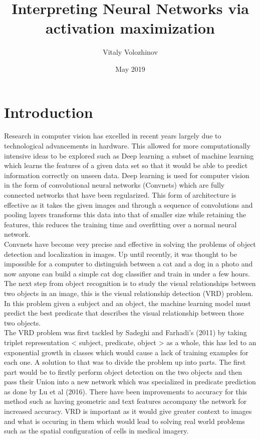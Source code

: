 \documentclass{csfyp}
\title{Interpreting Neural Networks via activation maximization}
\author{Vitaly Volozhinov}
\date{May 2019}
\newcommand\tab[1][1cm]{\hspace*{#1}}
\begin{document}
\tableofcontents


\setcounter{page}{1}
\newpage

\section{Introduction}
\label{s:intro}
\tab
Research in computer vision has excelled in recent years largely due to technological advancements in hardware. This allowed for more computationally intensive ideas to be explored such as Deep learning a subset of machine learning which learns the features of a given data set so that it would be able to predict information correctly on unseen data.
Deep learning is used for computer vision in the form of convolutional neural networks (Convnets) which are fully connected networks that have been regularized. This form of architecture is effective as it takes the given images and through a sequence of convolutions and pooling layers transforms this data into that of smaller size while retaining the features, this reduces the training time and overfitting over a normal neural network.
\\
\tab
Convnets have become very precise and effective in solving the problems of object detection and localization in images. Up until recently, it was thought to be impossible for a computer to distinguish between a cat and a dog in a photo and now anyone can build a simple cat dog classifier and train in under a few hours. The next step from object recognition is to study the visual relationships between two objects in an image, this is the visual relationship detection (VRD) problem. In this problem given a subject and an object, the machine learning model must predict the best predicate that describes the visual relationship between those two objects. 
\\
\tab
The VRD problem was first tackled by Sadeghi and Farhadi’s (2011) by taking triplet representation < subject, predicate, object > as a whole, this has led to an exponential growth in classes which would cause a lack of training examples for each one. A solution to that was to divide the problem up into parts. The first part would be to firstly perform object detection on the two objects and then pass their Union into a new network which was specialized in predicate prediction as done by Lu et al (2016). There have been improvements to accuracy for this method such as having geometric and text features accompany the network for increased accuracy. VRD is important as it would give greater context to images and what is occuring in them which would lead to solving real world problems such as the spatial configuration of cells in medical imagery.
\end{document}
